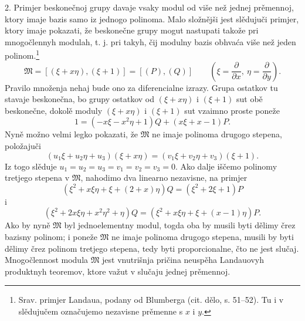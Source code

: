 \documentclass[11pt]{article}
\begin{document}
2. Primjer beskonečnoj grupy davaje vsaky modul od više než jednej prěmennoj, ktory imaje bazis samo iz jednogo polinoma. Malo složnějši jest slědujuči primjer, ktory imaje pokazati, že beskonečne grupy mogut nastupati takože pri mnogočlennyh modulah, t. j. pri takyh, čij modulny bazis obhvaća više než jeden polinom.\footnote{Srav. primjer Landaua, podany od Blumberga (cit. dělo, s. 51--52). Tu i v slědujučem označujemo nezavisne prěmenne s \(x\) i \(y\).}
\[
 \mathfrak M=[(\xi+x\eta),(\xi+1)]=[(P),(Q)]
 \qquad\left(\xi=\frac{\partial}{\partial x},\ \eta=\frac{\partial}{\partial y}\right).
\]
Pravilo množenja nehaj bude ono za diferencialne izrazy. Grupa ostatkov tu stavaje beskonečna, bo grupy ostatkov od \((\xi+x\eta)\) i \((\xi+1)\) sut obě beskonečne, dokolě moduly \((\xi+x\eta)\) i \((\xi+1)\) sut vzaimno proste poneže
\[
 1=(-x\xi-x^2\eta+1)Q+(x\xi+x-1)P.
\]
Nyně možno velmi legko pokazati, že \(\mathfrak M\) ne imaje polinoma drugogo stepena, položajuči
\[
 (u_1\xi+u_2\eta+u_3)(\xi+x\eta)=(v_1\xi+v_2\eta+v_3)(\xi+1).
\]
Iz togo slěduje \(u_1=u_2=u_3=v_1=v_2=v_3=0\). Ako dalje iščemo polinomy tretjego stepena v \(\mathfrak M\), nahodimo dva linearno nezavisne, na primjer
\[
 (\xi^2+x\xi\eta+\xi+(2+x)\eta)Q=(\xi^2+2\xi+1)P
\]
i
\[
 (\xi^2+2x\xi\eta+x^2\eta^2+\eta)Q
 =(\xi^2+x\xi\eta+\xi+(x-1)\eta)P.
\]
Ako by nyně \(\mathfrak M\) byl jednoelementny modul, togda oba by musili byti dělimy črez bazisny polinom; i poneže \(\mathfrak M\) ne imaje polinoma drugogo stepena, musili by byti dělimy črez polinom tretjego stepena, tedy byti proporcionalne, čto ne jest slučaj. Mnogočlennost modula \(\mathfrak M\) jest vnutrišnja pričina neuspěha Landauovyh produktnyh teoremov, ktore važut v slučaju jednej prěmennoj.
\end{document}
